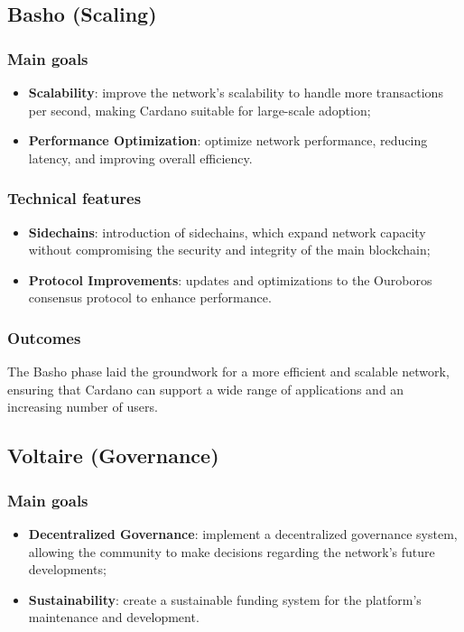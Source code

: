 \vspace{0.3cm}

\subsection{Basho (Scaling)}

\subsubsection*{Main goals}
\begin{itemize}
    \item \textbf{Scalability}: improve the network's scalability to handle more 
        transactions per second, making Cardano suitable for large-scale adoption;
    \item \textbf{Performance Optimization}: optimize network performance, reducing 
        latency, and improving overall efficiency.
\end{itemize}

\subsubsection*{Technical features}
\begin{itemize}
    \item \textbf{Sidechains}: introduction of sidechains, which expand network capacity 
        without compromising the security and integrity of the main blockchain;
    \item \textbf{Protocol Improvements}: updates and optimizations to the Ouroboros 
        consensus protocol to enhance performance.
\end{itemize}

\subsubsection*{Outcomes}
The Basho phase laid the groundwork for a more efficient and scalable network, ensuring 
that Cardano can support a wide range of applications and an increasing number of users.

\vspace{0.3cm}

\subsection{Voltaire (Governance)}

\subsubsection*{Main goals}
\begin{itemize}
    \item \textbf{Decentralized Governance}: implement a decentralized governance system, 
        allowing the community to make decisions regarding the network's future developments;
    \item \textbf{Sustainability}: create a sustainable funding system for the platform's 
        maintenance and development.
\end{itemize}

